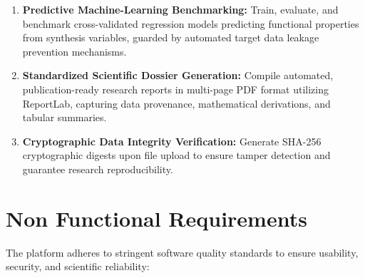 \documentclass[12pt,a4paper,oneside]{report}
\begin{document}
{{{\begin{enumerate}
    \item \textbf{Predictive Machine-Learning Benchmarking:} Train, evaluate, and benchmark cross-validated regression models predicting functional properties from synthesis variables, guarded by automated target data leakage prevention mechanisms.
    \item \textbf{Standardized Scientific Dossier Generation:} Compile automated, publication-ready research reports in multi-page PDF format utilizing ReportLab, capturing data provenance, mathematical derivations, and tabular summaries.
    \item \textbf{Cryptographic Data Integrity Verification:} Generate SHA-256 cryptographic digests upon file upload to ensure tamper detection and guarantee research reproducibility.
\end{enumerate}

\section{Non Functional Requirements}

The platform adheres to stringent software quality standards to ensure usability, security, and scientific reliability:

}}}
\end{document}
